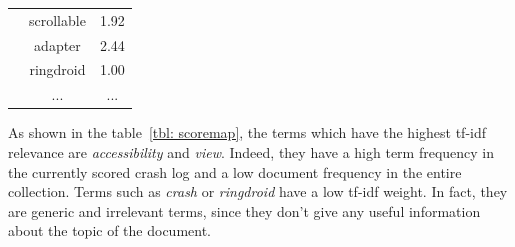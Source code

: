 \begin{table}[tb]
\begin{tabular}{l|c|c|}
                                                                                                            & scrollable                            & 1.92                                  \\ \cline{2-3} 
                                                                                                            & adapter                               & 2.44                                  \\ \cline{2-3} 
                                                                                                            & ringdroid                             & 1.00                                  \\ \cline{2-3} 
                                                                                                            & ...                             & ...                                  
\end{tabular}
\end{table}

As shown in the table~\ref{tbl: scoremap}, the terms which have the highest tf-idf relevance are \textit{accessibility} and \textit{view}. Indeed, they have a high term frequency in the currently scored crash log and a low document frequency in the entire collection. 
Terms such as \textit{crash} or \textit{ringdroid} have a low tf-idf weight. In fact, they are generic and irrelevant terms, since they don't give any useful information about the topic of the document. \\

